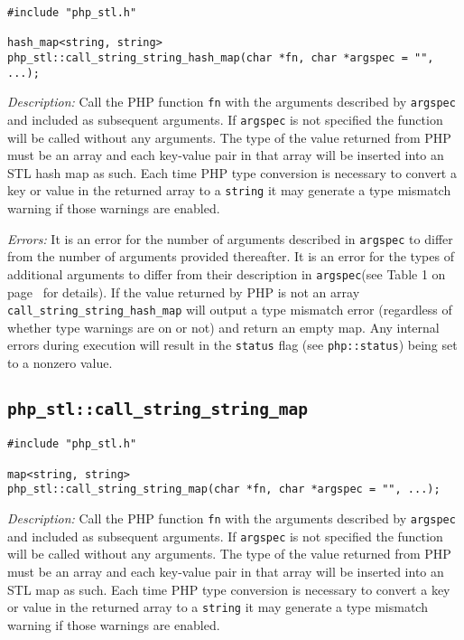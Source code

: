 \documentclass[11pt,titlepage]{article}
\begin{document}
\begin{verbatim}
#include "php_stl.h"

hash_map<string, string> 
php_stl::call_string_string_hash_map(char *fn, char *argspec = "", ...);
\end{verbatim}

\emph{Description:} Call the PHP function \verb|fn| with the arguments described by \verb|argspec| and included as subsequent arguments. If \verb|argspec| is not specified the function will be called without any arguments. The type of the value returned from PHP must be an array and each key-value pair in that array will be inserted into an STL hash map as such. Each time PHP type conversion is necessary to convert a key or value in the returned array to a \verb|string| it may generate a type mismatch warning if those warnings are enabled.

\emph{Errors:} It is an error for the number of arguments described in \verb|argspec| to differ from the number of arguments provided thereafter. It is an error for the types of additional arguments to differ from their description in \verb|argspec|(see Table 1 on page~\pageref{Table1} for details). If the value returned by PHP is not an array \verb|call_string_string_hash_map| will output a type mismatch error (regardless of whether type warnings are on or not) and return an empty map. Any internal errors during execution will result in the \verb|status| flag (see \verb|php::status|) being set to a nonzero value.


\subsection{\texttt{php\_stl::call\_string\_string\_map}}

\begin{verbatim}
#include "php_stl.h"

map<string, string> 
php_stl::call_string_string_map(char *fn, char *argspec = "", ...);
\end{verbatim}

\emph{Description:} Call the PHP function \verb|fn| with the arguments described by \verb|argspec| and included as subsequent arguments. If \verb|argspec| is not specified the function will be called without any arguments. The type of the value returned from PHP must be an array and each key-value pair in that array will be inserted into an STL map as such. Each time PHP type conversion is necessary to convert a key or value in the returned array to a \verb|string| it may generate a type mismatch warning if those warnings are enabled.
\end{document}
